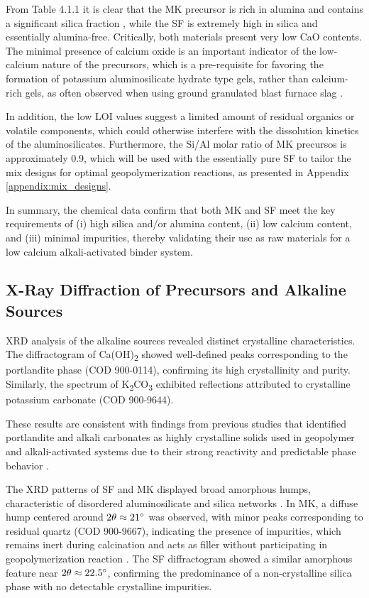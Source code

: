 From Table 4.1.1 it is clear that the MK precursor is rich in alumina and contains a significant silica fraction , while the SF is extremely high in silica and essentially alumina-free.
Critically, both materials present very low CaO contents.
The minimal presence of calcium oxide is an important indicator of the low-calcium nature of the precursors, which is a pre-requisite for favoring the formation of potassium aluminosilicate hydrate type gels, rather than calcium-rich gels, as often observed when using ground granulated blast furnace slag \cite{ali2023geopolymer}.


In addition, the low LOI values suggest a limited amount of residual organics or volatile components, which could otherwise interfere with the dissolution kinetics of the aluminosilicates.
Furthermore, the Si/Al molar ratio of MK precursos is approximately 0.9, which will be used with the essentially pure SF to tailor the mix designs for optimal geopolymerization reactions, as presented in Appendix \ref{appendix:mix_designs}.

In summary, the chemical data confirm that both MK and SF meet the key requirements of (i) high silica and/or alumina content, (ii) low calcium content, and (iii) minimal impurities, thereby validating their use as raw materials for a low calcium alkali-activated binder system.

\subsection{X-Ray Diffraction of Precursors and Alkaline Sources}
\label{sec:x-ray_diffraction_of_precursors_and_alkaline_sources}

XRD analysis of the alkaline sources revealed distinct crystalline characteristics.
The diffractogram of Ca(OH)\textsubscript{2} showed well-defined peaks corresponding to the portlandite phase (COD 900-0114), confirming its high crystallinity and purity.
Similarly, the spectrum of K\textsubscript{2}CO\textsubscript{3} exhibited reflections attributed to crystalline potassium carbonate (COD 900-9644).

These results are consistent with findings from previous studies that identified portlandite and alkali carbonates as highly crystalline solids used in geopolymer and alkali-activated systems due to their strong reactivity and predictable phase behavior \cite{Provis2014}.

The XRD patterns of SF and MK displayed broad amorphous humps, characteristic of disordered aluminosilicate and silica networks \cite{provis2009geopolymers,ke2021one}.
In MK, a diffuse hump centered around $2\theta \approx 21^{\circ}$ was observed, with minor peaks corresponding to residual quartz (COD 900-9667), indicating the presence of impurities, which remains inert during calcination \cite{provis2014geopolymers} and acts as filler without participating in geopolymerization reaction \cite{rakhimova2019metakaolin}.
The SF diffractogram showed a similar amorphous feature near $2\theta \approx 22.5^{\circ}$, confirming the predominance of a non-crystalline silica phase with no detectable crystalline impurities.

